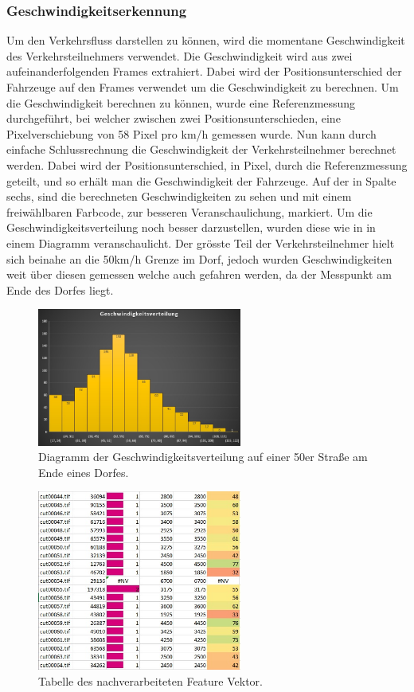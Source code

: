 \subsubsection{Geschwindigkeitserkennung}
Um den Verkehrsfluss darstellen zu können, wird die momentane Geschwindigkeit des Verkehrsteilnehmers verwendet. Die Geschwindigkeit wird aus zwei aufeinanderfolgenden Frames extrahiert. Dabei wird der Positionsunterschied der Fahrzeuge auf den Frames verwendet um die Geschwindigkeit zu berechnen. Um die Geschwindigkeit berechnen zu können, wurde eine Referenzmessung durchgeführt, bei welcher zwischen zwei Positionsunterschieden, eine Pixelverschiebung von 58 Pixel pro km/h gemessen wurde. Nun kann durch einfache Schlussrechnung die Geschwindigkeit der Verkehrsteilnehmer berechnet werden. Dabei wird der Positionsunterschied, in Pixel, durch die Referenzmessung geteilt, und so erhält man die Geschwindigkeit der Fahrzeuge. Auf der  in Spalte sechs, sind die berechneten Geschwindigkeiten zu sehen und mit einem freiwählbaren Farbcode, zur besseren Veranschaulichung, markiert. Um die Geschwindigkeitsverteilung noch besser darzustellen, wurden diese wie in  in einem Diagramm veranschaulicht. Der grösste Teil der Verkehrsteilnehmer hielt sich beinahe an die 50km/h Grenze im Dorf, jedoch wurden Geschwindigkeiten weit über diesen gemessen welche auch gefahren werden, da der Messpunkt am Ende des Dorfes liegt.

\begin{figure}[H]
  \centering
  \includegraphics[width=0.6\textwidth]{Resultate/GeschwDiagramm.jpg} 
  \caption{Diagramm der Geschwindigkeitsverteilung auf einer 50er Straße am Ende eines Dorfes.}
  \label{bGeschwDiagramm}
\end{figure}


\begin{figure}[H]
  \centering
  \includegraphics[width=0.6\textwidth]{Resultate/Nachverarbeitung.jpg} 
  \caption{Tabelle des nachverarbeiteten Feature Vektor.}
  \label{bNachverarbeitung}
\end{figure}